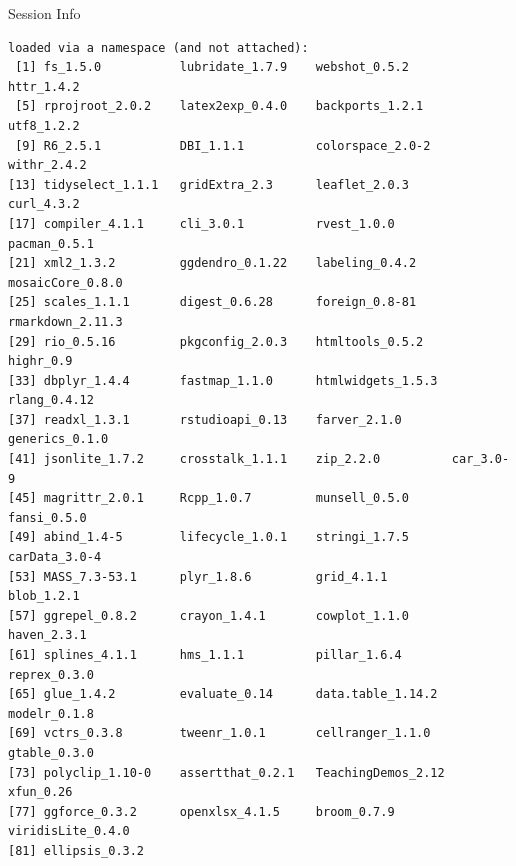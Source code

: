 \documentclass[10pt,handout]{beamer}\usepackage[]{graphicx}\usepackage[]{color}
\makeatletter
\newenvironment{kframe}{%
 \def\at@end@of@kframe{}%
 \ifinner\ifhmode%
  \def\at@end@of@kframe{\end{minipage}}%
  \begin{minipage}{\columnwidth}%
 \fi\fi%
 \def\FrameCommand##1{\hskip\@totalleftmargin \hskip-\fboxsep
 \colorbox{shadecolor}{##1}\hskip-\fboxsep
     \hskip-\linewidth \hskip-\@totalleftmargin \hskip\columnwidth}%
 \MakeFramed {\advance\hsize-\width
   \@totalleftmargin\z@ \linewidth\hsize
   \@setminipage}}%
 {\par\unskip\endMakeFramed%
 \at@end@of@kframe}
\newenvironment{knitrout}{}{} %
\makeatother
\begin{document}
\begin{frame}[fragile]{Session Info}
\begin{knitrout}
\begin{kframe}
\begin{verbatim}
loaded via a namespace (and not attached):
 [1] fs_1.5.0           lubridate_1.7.9    webshot_0.5.2      httr_1.4.2        
 [5] rprojroot_2.0.2    latex2exp_0.4.0    backports_1.2.1    utf8_1.2.2        
 [9] R6_2.5.1           DBI_1.1.1          colorspace_2.0-2   withr_2.4.2       
[13] tidyselect_1.1.1   gridExtra_2.3      leaflet_2.0.3      curl_4.3.2        
[17] compiler_4.1.1     cli_3.0.1          rvest_1.0.0        pacman_0.5.1      
[21] xml2_1.3.2         ggdendro_0.1.22    labeling_0.4.2     mosaicCore_0.8.0  
[25] scales_1.1.1       digest_0.6.28      foreign_0.8-81     rmarkdown_2.11.3  
[29] rio_0.5.16         pkgconfig_2.0.3    htmltools_0.5.2    highr_0.9         
[33] dbplyr_1.4.4       fastmap_1.1.0      htmlwidgets_1.5.3  rlang_0.4.12      
[37] readxl_1.3.1       rstudioapi_0.13    farver_2.1.0       generics_0.1.0    
[41] jsonlite_1.7.2     crosstalk_1.1.1    zip_2.2.0          car_3.0-9         
[45] magrittr_2.0.1     Rcpp_1.0.7         munsell_0.5.0      fansi_0.5.0       
[49] abind_1.4-5        lifecycle_1.0.1    stringi_1.7.5      carData_3.0-4     
[53] MASS_7.3-53.1      plyr_1.8.6         grid_4.1.1         blob_1.2.1        
[57] ggrepel_0.8.2      crayon_1.4.1       cowplot_1.1.0      haven_2.3.1       
[61] splines_4.1.1      hms_1.1.1          pillar_1.6.4       reprex_0.3.0      
[65] glue_1.4.2         evaluate_0.14      data.table_1.14.2  modelr_0.1.8      
[69] vctrs_0.3.8        tweenr_1.0.1       cellranger_1.1.0   gtable_0.3.0      
[73] polyclip_1.10-0    assertthat_0.2.1   TeachingDemos_2.12 xfun_0.26         
[77] ggforce_0.3.2      openxlsx_4.1.5     broom_0.7.9        viridisLite_0.4.0 
[81] ellipsis_0.3.2    
\end{verbatim}
\end{kframe}
\end{knitrout}
	
\end{frame}
\end{document}
